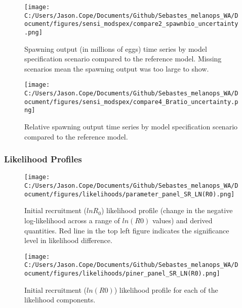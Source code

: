 \documentclass[11pt,
  english,
  letterpaper,
]{article}
\begin{document}
\pagebreak

\begin{figure}
\centering
\texttt{[image: C:/Users/Jason.Cope/Documents/Github/Sebastes\_melanops\_WA/Document/figures/sensi\_modspex/compare2\_spawnbio\_uncertainty.png]}
\caption{Spawning output (in millions of eggs) time series by model specification scenario compared to the reference model. Missing scenarios mean the spawning output was too large to show.\label{fig:sensi-modspec-ssb}}
\end{figure}

\pagebreak

\begin{figure}
\centering
\texttt{[image: C:/Users/Jason.Cope/Documents/Github/Sebastes\_melanops\_WA/Document/figures/sensi\_modspex/compare4\_Bratio\_uncertainty.png]}
\caption{Relative spawning output time series by model specification scenario compared to the reference model.\label{fig:sensi-modspec-depl}}
\end{figure}

\pagebreak

\hypertarget{likelihood-profiles-1}{%
\subsubsection{Likelihood Profiles}\label{likelihood-profiles-1}}

\begin{figure}
\centering
\texttt{[image: C:/Users/Jason.Cope/Documents/Github/Sebastes\_melanops\_WA/Document/figures/likelihoods/parameter\_panel\_SR\_LN(R0).png]}
\caption{Initial recruitment (\(lnR_0\)) likelihood profile (change in the negative log-likelihood across a range of \(ln(R0)\) values) and derived quantities. Red line in the top left figure indicates the significance level in likelihood difference.\label{fig:R0-profile}}
\end{figure}

\pagebreak

\begin{figure}
\centering
\texttt{[image: C:/Users/Jason.Cope/Documents/Github/Sebastes\_melanops\_WA/Document/figures/likelihoods/piner\_panel\_SR\_LN(R0).png]}
\caption{Initial recruitment (\(ln(R0)\)) likelihood profile for each of the likelihood components.\label{fig:R0-profile-components}}
\end{figure}
\end{document}
